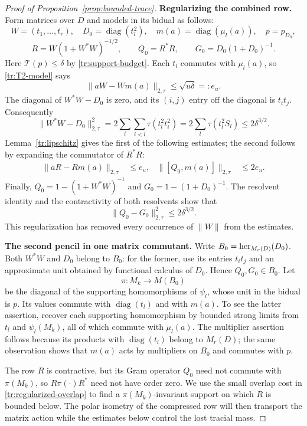 \begin{proof}[Proof of Proposition~\ref{prop:bounded-trace}]
\medskip\noindent
\textbf{Regularizing the combined row.}
Form matrices over $D$ and models in its bidual as follows:
\[
 W=(t_1,\ldots,t_r),\quad D_0=\operatorname{diag}(t_l^2),\quad
 m(a)=\operatorname{diag}(\mu_l(a)),\quad p=p_{D_0},
\]
\[
 R=W(1+W^*W)^{-1/2},\qquad Q_0=R^*R,\qquad
 G_0=D_0(1+D_0)^{-1}.
\]
Here $\mathcal T(p)\leq\delta$ by \eqref{tr:support-budget}.
Each $t_l$ commutes with $\mu_l(a)$, so \eqref{tr:T2-model} says
\[
 \|aW-Wm(a)\|_{2,\tau}\leq\sqrt{u\delta}=:e_u.
\]
The diagonal of $W^*W-D_0$ is zero, and its $(i,j)$ entry off the
diagonal is $t_it_j$.  Consequently
\begin{equation}\label{tr:off-diagonal-cost}
 \|W^*W-D_0\|_{2,\tau}^2
 =2\sum_l\sum_{i<l}\tau(t_l^2t_i^2)
 =2\sum_l\tau(t_l^2S_l)\leq2\delta^{3/2}.
\end{equation}
Lemma~\ref{tr:lipschitz} gives the first of the following estimates;
the second follows by expanding the commutator of $R^*R$:
\begin{align}
 \|aR-Rm(a)\|_{2,\tau}&\leq e_u,
 &\|[Q_0,m(a)]\|_{2,\tau}&\leq2e_u.
 \label{tr:regularized-central}
\end{align}
Finally, $Q_0=1-(1+W^*W)^{-1}$ and
$G_0=1-(1+D_0)^{-1}$.  The resolvent identity and the contractivity of
both resolvents show that
\begin{equation}\label{tr:regularized-overlap}
 \|Q_0-G_0\|_{2,\tau}^2\leq2\delta^{3/2}.
\end{equation}
This regularization has removed every occurrence of $\|W\|$ from the
estimates.

\medskip\noindent
\textbf{The second pencil in one matrix commutant.}
Write $B_0=\operatorname{her}_{M_r(D)}(D_0)$.  Both $W^*W$ and $D_0$ belong to
$B_0$: for the former, use its entries $t_it_j$ and an approximate
unit obtained by functional calculus of $D_0$.  Hence $Q_0,G_0\in B_0$.
Let
\[
 \pi:M_k\longrightarrow M(B_0)
\]
be the diagonal of the supporting homomorphisms of $\psi_l$, whose
unit in the bidual is $p$.  Its values commute with
$\operatorname{diag}(t_l)$ and with $m(a)$.  To see the latter assertion,
recover each supporting homomorphism by bounded strong limits from
$t_l$ and $\psi_l(M_k)$, all of which commute with $\mu_l(a)$.
The multiplier assertion follows because its products with
$\operatorname{diag}(t_l)$ belong to $M_r(D)$; the same observation
shows that $m(a)$ acts by multipliers on $B_0$ and commutes with $p$.

The row $R$ is contractive, but its Gram operator $Q_0$ need not
commute with $\pi(M_k)$, so $R\pi(\cdot)R^*$ need not have order zero.
We use the small overlap cost in \eqref{tr:regularized-overlap} to find
a $\pi(M_k)$-invariant support on which $R$ is bounded below. The polar
isometry of the compressed row will then transport the matrix action
while the estimates below control the lost tracial mass.


\end{proof}
